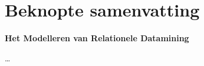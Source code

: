 \chapter*{Beknopte samenvatting}
\textbf{Het Modelleren van Relationele Datamining}


\ldots


\instructionsabstract

\cleardoublepage

